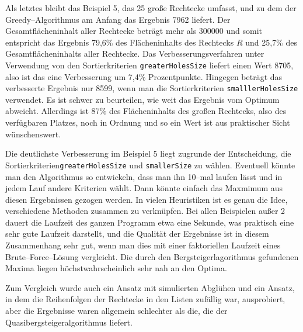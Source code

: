 Als letztes bleibt das Beispiel 5, das 25 große Rechtecke umfasst, und zu dem 
der Greedy--Algorithmus am Anfang das Ergebnis 7962 liefert. 
Der Gesamtflächeninhalt aller Rechtecke beträgt mehr als 300000 und somit
entspricht das Ergebnis 79,6\% des Flächeninhalts des Rechtecks $R$ und
25,7\% des Gesamtflächeninhalts aller Rechtecke.
Das Verbesserungsverfahren unter Verwendung von den Sortierkriterien \texttt{greaterHolesSize}
liefert einen Wert 8705, also ist das eine Verbesserung um 7,4\% Prozentpunkte.
Hingegen beträgt das verbesserte Ergebnis nur 8599, wenn man 
die Sortierkriterien \texttt{smalllerHolesSize} verwendet. 
Es ist schwer zu beurteilen, wie weit das Ergebnis vom Optimum abweicht. 
Allerdings ist 87\% des Flächeninhalts des großen Rechtecks, also des verfügbaren Platzes,
noch in Ordnung und so ein Wert ist aus praktischer Sicht wünschenswert. 

Die deutlichste Verbesserung im Beispiel 5 liegt zugrunde der Entscheidung,
die Sortierkriterien\break \texttt{greaterHolesSize} und \texttt{smallerSize} zu wählen.
Eventuell könnte man den Algorithmus so entwickeln, dass man ihn 10--mal laufen lässt
und in jedem Lauf andere Kriterien wählt. Dann könnte einfach das Maxmimum aus 
diesen Ergebnissen gezogen werden. In vielen Heuristiken ist es genau die Idee, verschiedene Methoden
zusammen zu verknüpfen.
Bei allen Beispielen außer 2 dauert die Laufzeit des ganzen Programm etwa eine Sekunde,
was praktisch eine sehr gute Laufzeit darstellt, und die Qualität der Ergebnisse 
ist in diesem Zusammenhang sehr gut, wenn man dies mit einer faktoriellen Laufzeit 
eines Brute--Force--Lösung vergleicht. Die durch den Bergsteigerlagorithmus 
gefundenen Maxima liegen höchstwahrscheinlich sehr nah an den Optima.

Zum Vergleich wurde auch ein Ansatz mit simulierten Abglühen und ein Ansatz, in
dem die Reihenfolgen der Rechtecke in den Listen zufällig war, ausprobiert, aber
die Ergebnisse waren allgemein schlechter als die, die der Quasibergsteigeralgorithmus liefert.